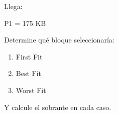 \documentclass[
  spanish,
  letterpaper,
]{scrbook}
\newenvironment{Shaded}{\begin{snugshade}}{\end{snugshade}}
\newcommand{\NormalTok}[1]{\textcolor[rgb]{0.00,0.23,0.31}{#1}}
\providecommand{\tightlist}{%
  \setlength{\itemsep}{0pt}\setlength{\parskip}{0pt}}
\begin{document}
Llega:

\begin{Shaded}
\begin{Highlighting}[]
\NormalTok{P1 = 175 KB}
\end{Highlighting}
\end{Shaded}

Determine qué bloque seleccionaría:

\begin{enumerate}
\def\labelenumi{\arabic{enumi}.}
\tightlist
\item
  First Fit
\item
  Best Fit
\item
  Worst Fit
\end{enumerate}

Y calcule el sobrante en cada caso.
\end{document}
